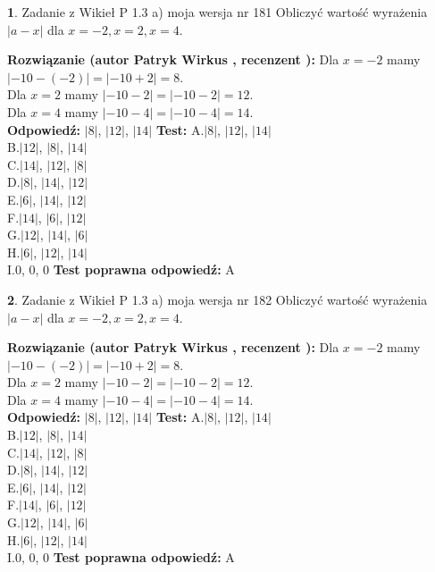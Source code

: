 \documentclass[12pt, a4paper]{article}
\theoremstyle{definition} %
\newtheorem{zad}{}
\newcommand{\zadStart}[1]{\begin{zad}#1\newline}
\newcommand{\zadStop}{\end{zad}}
\newcommand{\rozwStart}[2]{\noindent \textbf{Rozwiązanie (autor #1 , recenzent #2): }\newline}
\newcommand{\rozwStop}{\newline}
\newcommand{\odpStart}{\noindent \textbf{Odpowiedź:}\newline}
\newcommand{\odpStop}{\newline}
\newcommand{\testStart}{\noindent \textbf{Test:}\newline}
\newcommand{\testStop}{\newline}
\newcommand{\kluczStart}{\noindent \textbf{Test poprawna odpowiedź:}\newline}
\newcommand{\kluczStop}{\newline}
\begin{document}
\zadStart{Zadanie z Wikieł P 1.3 a) moja wersja nr 181}
Obliczyć wartość wyrażenia $|a - x|$ dla $x=-2,x=2,x=4$.
\zadStop
\rozwStart{Patryk Wirkus}{}
Dla $x = -2$ mamy $|-10 - (-2)| = |-10 + 2| = 8$.\\
Dla $x = 2$ mamy $|-10 - 2| = |-10 - 2| = 12$.\\
Dla $x = 4$ mamy $|-10 - 4| = |-10 - 4| = 14$.\\
\rozwStop
\odpStart
$|8|$, $|12|$, $|14|$
\odpStop
\testStart
A.$|8|$, $|12|$, $|14|$\\
B.$|12|$, $|8|$, $|14|$\\
C.$|14|$, $|12|$, $|8|$\\
D.$|8|$, $|14|$, $|12|$\\
E.$|6|$, $|14|$, $|12|$\\
F.$|14|$, $|6|$, $|12|$\\
G.$|12|$, $|14|$, $|6|$\\
H.$|6|$, $|12|$, $|14|$\\
I.$0$, $0$, $0$
\testStop
\kluczStart
A
\kluczStop



\zadStart{Zadanie z Wikieł P 1.3 a) moja wersja nr 182}
Obliczyć wartość wyrażenia $|a - x|$ dla $x=-2,x=2,x=4$.
\zadStop
\rozwStart{Patryk Wirkus}{}
Dla $x = -2$ mamy $|-10 - (-2)| = |-10 + 2| = 8$.\\
Dla $x = 2$ mamy $|-10 - 2| = |-10 - 2| = 12$.\\
Dla $x = 4$ mamy $|-10 - 4| = |-10 - 4| = 14$.\\
\rozwStop
\odpStart
$|8|$, $|12|$, $|14|$
\odpStop
\testStart
A.$|8|$, $|12|$, $|14|$\\
B.$|12|$, $|8|$, $|14|$\\
C.$|14|$, $|12|$, $|8|$\\
D.$|8|$, $|14|$, $|12|$\\
E.$|6|$, $|14|$, $|12|$\\
F.$|14|$, $|6|$, $|12|$\\
G.$|12|$, $|14|$, $|6|$\\
H.$|6|$, $|12|$, $|14|$\\
I.$0$, $0$, $0$
\testStop
\kluczStart
A
\kluczStop
\end{document}
